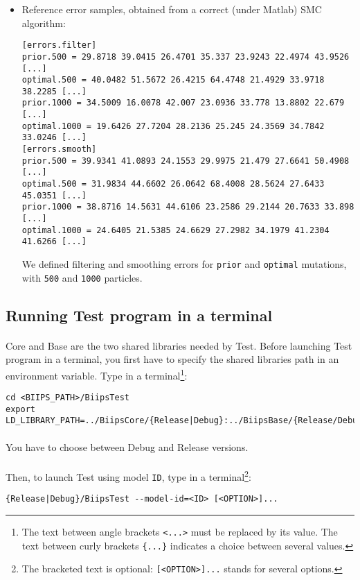 \begin{itemize}
\item Reference error samples, \ie{} obtained from a correct (under Matlab) SMC algorithm:
\begin{verbatim}
[errors.filter]
prior.500 = 29.8718 39.0415 26.4701 35.337 23.9243 22.4974 43.9526 [...]
optimal.500 = 40.0482 51.5672 26.4215 64.4748 21.4929 33.9718 38.2285 [...]
prior.1000 = 34.5009 16.0078 42.007 23.0936 33.778 13.8802 22.679 [...]
optimal.1000 = 19.6426 27.7204 28.2136 25.245 24.3569 34.7842 33.0246 [...]
[errors.smooth]
prior.500 = 39.9341 41.0893 24.1553 29.9975 21.479 27.6641 50.4908 [...]
optimal.500 = 31.9834 44.6602 26.0642 68.4008 28.5624 27.6433 45.0351 [...]
prior.1000 = 38.8716 14.5631 44.6106 23.2586 29.2144 20.7633 33.898 [...]
optimal.1000 = 24.6405 21.5385 24.6629 27.2982 34.1979 41.2304 41.6266 [...]
\end{verbatim}
We defined filtering and smoothing errors for \verb!prior! and \verb!optimal! mutations, with \verb!500! and \verb!1000! particles.
\end{itemize}

\subsection{Running \biips Test program in a terminal}

\paragraph{}
\biips Core and \biips Base are the two shared libraries needed by \biips Test. Before launching \biips Test program in a terminal, you first have to specify the shared libraries path in an environment variable. Type in a terminal\footnote{The text between angle brackets \texttt{<...>} must be replaced by its value. The text between curly brackets \texttt{\{...\}} indicates a choice between several values.}:
\begin{verbatim}
cd <BIIPS_PATH>/BiipsTest
export LD_LIBRARY_PATH=../BiipsCore/{Release|Debug}:../BiipsBase/{Release/Debug}
\end{verbatim}

\paragraph{}
You have to choose between Debug and Release versions.

\paragraph{}
Then, to launch \biips Test using model \verb=ID=, type in a terminal\footnote{The bracketed text is optional: \texttt{[<OPTION>]...} stands for several options.}:
\begin{verbatim}
{Release|Debug}/BiipsTest --model-id=<ID> [<OPTION>]...
\end{verbatim}

